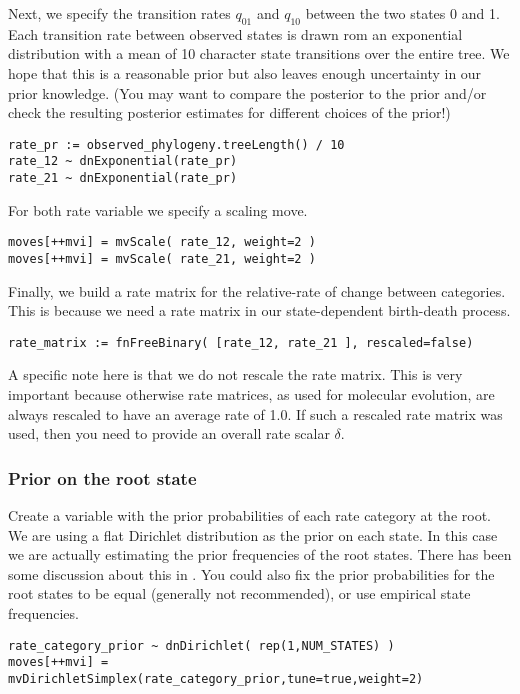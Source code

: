 Next, we specify the transition rates $q_{01}$ and $q_{10}$ between the two states 0 and 1.
Each transition rate between observed states is drawn rom an exponential distribution with a mean of 10 character state transitions over the entire tree. 
We hope that this is a reasonable prior but also leaves enough uncertainty in our prior knowledge.
(You may want to compare the posterior to the prior and/or check the resulting posterior estimates for different choices of the prior!)
{\tt \begin{snugshade*}
\begin{lstlisting}
rate_pr := observed_phylogeny.treeLength() / 10
rate_12 ~ dnExponential(rate_pr)
rate_21 ~ dnExponential(rate_pr)
\end{lstlisting}
\end{snugshade*}}
For both rate variable we specify a scaling move.
{\tt \begin{snugshade*}
\begin{lstlisting}
moves[++mvi] = mvScale( rate_12, weight=2 )
moves[++mvi] = mvScale( rate_21, weight=2 )
\end{lstlisting}
\end{snugshade*}}
Finally, we build a rate matrix for the relative-rate of change between categories.
This is because we need a rate matrix in our state-dependent birth-death process.
{\tt \begin{snugshade*}
\begin{lstlisting}
rate_matrix := fnFreeBinary( [rate_12, rate_21 ], rescaled=false)
\end{lstlisting}
\end{snugshade*}}
A specific note here is that we do not rescale the rate matrix. 
This is very important because otherwise rate matrices, as used for molecular evolution, are always rescaled to have an average rate of 1.0.
If such a rescaled rate matrix was used, then you need to provide an overall rate scalar $\delta$.

\subsubsection{Prior on the root state}
Create a variable with the prior probabilities of each rate category at the root.
We are using a flat Dirichlet distribution as the prior on each state.
In this case we are actually estimating the prior frequencies of the root states.
There has been some discussion about this in \cite{FitzJohn2009}.
You could also fix the prior probabilities for the root states to be equal (generally not recommended), or use empirical state frequencies. 
{\tt \begin{snugshade*}
\begin{lstlisting}
rate_category_prior ~ dnDirichlet( rep(1,NUM_STATES) )
moves[++mvi] = mvDirichletSimplex(rate_category_prior,tune=true,weight=2)
\end{lstlisting}
\end{snugshade*}}

